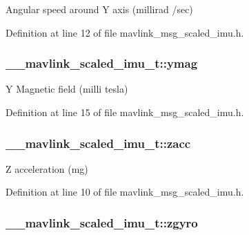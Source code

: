 Angular speed around Y axis (millirad /sec) 



Definition at line 12 of file mavlink\-\_\-msg\-\_\-scaled\-\_\-imu.\-h.

\hypertarget{struct____mavlink__scaled__imu__t_a9a17a611fe6ec9e3f5a384cb1708e0e9}{
\subsubsection[{ymag}]{ \-\_\-\-\_\-mavlink\-\_\-scaled\-\_\-imu\-\_\-t\-::ymag}}\label{struct____mavlink__scaled__imu__t_a9a17a611fe6ec9e3f5a384cb1708e0e9}


Y Magnetic field (milli tesla) 



Definition at line 15 of file mavlink\-\_\-msg\-\_\-scaled\-\_\-imu.\-h.

\hypertarget{struct____mavlink__scaled__imu__t_aa7263339399089b12c2874278033a5a1}{
\subsubsection[{zacc}]{ \-\_\-\-\_\-mavlink\-\_\-scaled\-\_\-imu\-\_\-t\-::zacc}}\label{struct____mavlink__scaled__imu__t_aa7263339399089b12c2874278033a5a1}


Z acceleration (mg) 



Definition at line 10 of file mavlink\-\_\-msg\-\_\-scaled\-\_\-imu.\-h.

\hypertarget{struct____mavlink__scaled__imu__t_a907db6388e441e51dc12ca89fa6c557b}{
\subsubsection[{zgyro}]{ \-\_\-\-\_\-mavlink\-\_\-scaled\-\_\-imu\-\_\-t\-::zgyro}}\label{struct____mavlink__scaled__imu__t_a907db6388e441e51dc12ca89fa6c557b}


